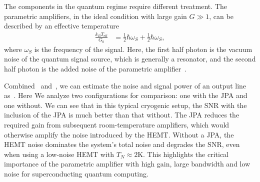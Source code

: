 \documentclass[a4paper,onecolumn,11pt,unpublished]{quantumarticle}
\newcommand{\Teff}{T_{\mathrm{eff}}}
\begin{document}
The components in the quantum regime require different treatment. The parametric amplifiers, in the ideal condition with large gain $G\gg 1$, can be described by an effective temperature
\begin{align}
  \frac{k_B \Teff}{G_0} & = \frac{1}{2}\hbar \omega_S + \frac{1}{2}\hbar \omega_S , \label{eq:teff_jpa}
\end{align}
where $\omega_S$ is the frequency of the signal. Here, the first half photon is the vacuum noise of the quantum signal source, which is generally a resonator, and the second half photon is the added noise of the parametric amplifier~\cite{Clerk2010Introduction}.

Combined~ and~, we can estimate the noise and signal power of an output line as~. Here We analyze two configurations for comparison: one with the JPA and one without. We can see that in this typical cryogenic setup, the SNR with the inclusion of the JPA is much better than that without. The JPA reduces the required gain from subsequent room-temperature amplifiers, which would otherwise amplify the noise introduced by the HEMT. Without a JPA, the HEMT noise dominates the system's total noise and degrades the SNR, even when using a low-noise HEMT with $T_N\approx 2\mathrm{K}$. This highlights the critical importance of the parametric amplifier with high gain, large bandwidth and low noise for superconducting quantum computing.
\end{document}
